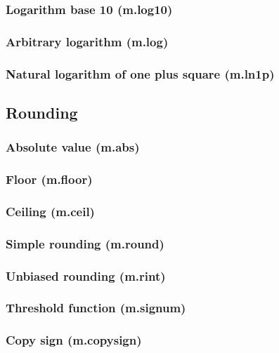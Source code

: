 \documentclass{article}
\theoremstyle{definition}
\begin{document}
\subsubsection{Logarithm base 10 (m.log10)}

\subsubsection{Arbitrary logarithm (m.log)}

\subsubsection{Natural logarithm of one plus square (m.ln1p)}

\subsection{Rounding}

\subsubsection{Absolute value (m.abs)}

\subsubsection{Floor (m.floor)}

\subsubsection{Ceiling (m.ceil)}

\subsubsection{Simple rounding (m.round)}

\subsubsection{Unbiased rounding (m.rint)}

\subsubsection{Threshold function (m.signum)}

\subsubsection{Copy sign (m.copysign)}
\end{document}
